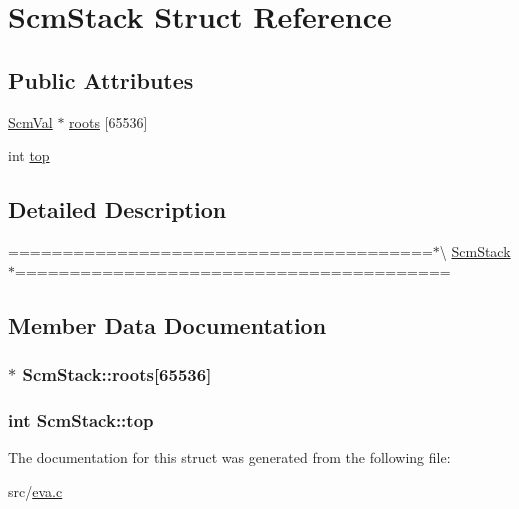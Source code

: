 \hypertarget{struct_scm_stack}{\section{Scm\-Stack Struct Reference}
\label{struct_scm_stack}
}
\subsection*{Public Attributes}
\begin{DoxyCompactItemize}
\item 
\hyperlink{eva_8h_a9e754b130d398cb7a4000c8c7a046427}{Scm\-Val} $\ast$ \hyperlink{struct_scm_stack_aeeddee9f1a8a2bf7153d1445cbb6f537}{roots} \mbox{[}65536\mbox{]}
\item 
int \hyperlink{struct_scm_stack_a7f59166ed4d2ccad61f10ab4cc2e563b}{top}
\end{DoxyCompactItemize}


\subsection{Detailed Description}
=======================================$\ast$\textbackslash{} \hyperlink{struct_scm_stack}{Scm\-Stack} $\ast$======================================== 

\subsection{Member Data Documentation}
\hypertarget{struct_scm_stack_aeeddee9f1a8a2bf7153d1445cbb6f537}{
\subsubsection[{roots}]{$\ast$ Scm\-Stack\-::roots\mbox{[}65536\mbox{]}}}\label{struct_scm_stack_aeeddee9f1a8a2bf7153d1445cbb6f537}
\hypertarget{struct_scm_stack_a7f59166ed4d2ccad61f10ab4cc2e563b}{
\subsubsection[{top}]{\setlength{\rightskip}{0pt plus 5cm}int Scm\-Stack\-::top}}\label{struct_scm_stack_a7f59166ed4d2ccad61f10ab4cc2e563b}


The documentation for this struct was generated from the following file\-:\begin{DoxyCompactItemize}
\item 
src/\hyperlink{eva_8c}{eva.\-c}\end{DoxyCompactItemize}

